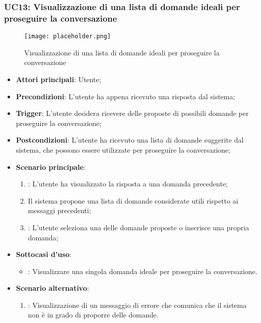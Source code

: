\hypertarget{UC13}{}
\subsubsection{UC13: Visualizzazione di una lista di domande ideali per proseguire la conversazione}

\begin{figure}[h]
    \centering
    \texttt{[image: placeholder.png]}
    \caption{Visualizzazione di una lista di domande ideali per proseguire la conversazione}
\end{figure}

\begin{itemize}
    \item \textbf{Attori principali}: Utente;
    \item \textbf{Precondizioni}: L'utente ha appena ricevuto una risposta dal sistema;
    \item \textbf{Trigger}: L'utente desidera ricevere delle proposte di possibili domande per proseguire la conversazione;
    \item \textbf{Postcondizioni}: L'utente ha ricevuto una lista di domande suggerite dal sistema, che possono essere utilizzate per proseguire la conversazione;
    \item \textbf{Scenario principale}:
    \begin{enumerate}
        \item {}: L'utente ha visualizzato la risposta a una domanda precedente;
        \item Il sistema propone una lista di domande considerate utili rispetto ai messaggi precedenti;
        \item {}: L'utente seleziona una delle domande proposte o inserisce una propria domanda;
    \end{enumerate}
    \item \textbf{Sottocasi d'uso}:
    \begin{itemize}
        \item {}: Visualizzare una singola domanda ideale per proseguire la conversazione.
    \end{itemize}
    \item \textbf{Scenario alternativo}:
    \begin{enumerate}
        \item {}: Visualizzazione di un messaggio di errore che comunica che il sistema non è in grado di proporre delle domande.
    \end{enumerate}
\end{itemize}


